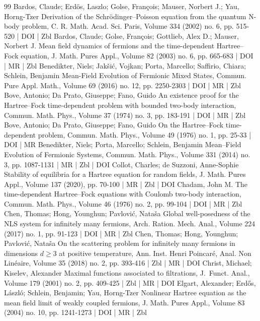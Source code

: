 \documentclass[10pt]{amsart}
\theoremstyle{definition}\newtheorem{defi}[theo]{Definition}\newtheorem{rema}[theo]{Remark}\newtheorem{exam}[theo]{Example}\newtheorem{exem}[theo]{Example}\newtheorem{nota}[theo]{Notation}
\begin{document}
\begin{thebibliography}{99}
Bardos, Claude; Erdös, Laszlo; Golse, François; Mauser, Norbert J.; Yau, Horng-Tzer Derivation of the Schrödinger–Poisson equation from the quantum N-body problem, C. R. Math. Acad. Sci. Paris, Volume 334 (2002) no. 6, pp. 515-520 | DOI | Zbl
Bardos, Claude; Golse, François; Gottlieb, Alex D.; Mauser, Norbert J. Mean field dynamics of fermions and the time-dependent Hartree–Fock equation, J. Math. Pures Appl., Volume 82 (2003) no. 6, pp. 665-683 | DOI | MR | Zbl
Benedikter, Niels; Jakšić, Vojkan; Porta, Marcello; Saffirio, Chiara; Schlein, Benjamin Mean-Field Evolution of Fermionic Mixed States, Commun. Pure Appl. Math., Volume 69 (2016) no. 12, pp. 2250-2303 | DOI | MR | Zbl
Bove, Antonio; Da Prato, Giuseppe; Fano, Guido An existence proof for the Hartree–Fock time-dependent problem with bounded two-body interaction, Commun. Math. Phys., Volume 37 (1974) no. 3, pp. 183-191 | DOI | MR | Zbl
Bove, Antonio; Da Prato, Giuseppe; Fano, Guido On the Hartree–Fock time-dependent problem, Commun. Math. Phys., Volume 49 (1976) no. 1, pp. 25-33 | DOI | MR
Benedikter, Niels; Porta, Marcello; Schlein, Benjamin Mean–Field Evolution of Fermionic Systems, Commun. Math. Phys., Volume 331 (2014) no. 3, pp. 1087-1131 | MR | Zbl | DOI
Collot, Charles; de Suzzoni, Anne-Sophie Stability of equilibria for a Hartree equation for random fields, J. Math. Pures Appl., Volume 137 (2020), pp. 70-100 | MR | Zbl | DOI
Chadam, John M. The time-dependent Hartree–Fock equations with Coulomb two-body interaction, Commun. Math. Phys., Volume 46 (1976) no. 2, pp. 99-104 | DOI | MR | Zbl
Chen, Thomas; Hong, Younghun; Pavlović, Nataša Global well-posedness of the NLS system for infinitely many fermions, Arch. Ration. Mech. Anal., Volume 224 (2017) no. 1, pp. 91-123 | DOI | MR | Zbl
Chen, Thomas; Hong, Younghun; Pavlović, Nataša On the scattering problem for infinitely many fermions in dimensions $d\ge 3$ at positive temperature, Ann. Inst. Henri Poincaré, Anal. Non Linéaire, Volume 35 (2018) no. 2, pp. 393-416 | Zbl | MR | DOI
Christ, Michael; Kiselev, Alexander Maximal functions associated to filtrations, J. Funct. Anal., Volume 179 (2001) no. 2, pp. 409-425 | Zbl | MR | DOI
Elgart, Alexander; Erdős, László; Schlein, Benjamin; Yau, Horng-Tzer Nonlinear Hartree equation as the mean field limit of weakly coupled fermions, J. Math. Pures Appl., Volume 83 (2004) no. 10, pp. 1241-1273 | DOI | MR | Zbl

\end{thebibliography}
\end{document}
